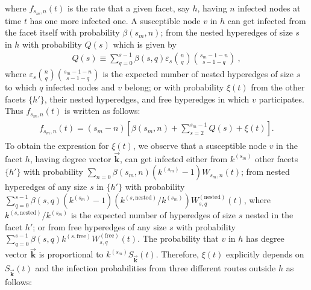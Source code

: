 \documentclass[aps,pre,twocolumn,nofootinbib,superscriptaddress,showpacs,showkeys]{revtex4-1}
\begin{document}
where $f_{s_{m},n}(t)$ is the rate that a given facet, say $h$, having $n$ infected nodes at time $t$ has one more infected one. 
A susceptible node $v$ in $h$ can get infected from the facet itself with probability $\beta(s_m,n)$; from the nested hyperedges of size $s$ in $h$ with probability $Q(s)$ which is given by
\begin{align}
Q(s)\equiv\sum_{q=0}^{s-1}\beta(s,q)\varepsilon_s {n \choose q}{s_m-1-n \choose s-1-q}~,
\end{align}
where $\varepsilon_s{n \choose q}{s_m-1-n \choose s-1-q}$ is the expected number of nested hyperedges of size $s$ to which $q$ infected nodes and $v$ belong; 
 or with probability $\xi(t)$ from the other facets $\{h'\}$, their nested hyperedges, and free hyperedges in which $v$ participates. 
Thus $f_{s_m,n}(t)$ is written as follows:  
\begin{align}
\begin{array}{ll}
    f_{s_{m},n}(t)=(s_{m}-n)\left[\beta(s_{m},n)
    +\sum\limits_{s=2}^{s_{m}-1} Q(s)+\xi(t)\right].
    \label{eq:eq4}
\end{array}
\end{align} 
To obtain the expression for $\xi(t)$, we observe that
a susceptible node $v$ in the facet $h$, having degree vector $\vec{\mathbf{k}}$, can get infected either from $k^{(s_m)}$ other facets $\{h'\}$ with probability $\sum_{n=0} \beta(s_m,n)(k^{(s_m)}-1)W_{s_m,n}(t)$; from nested hyperedges of any size $s$ in $\{h'\}$ with probability $\sum_{q=0}^{s-1} \beta(s,q)(k^{(s_{m})}-1)(k^{(s,\mathrm{nested})}/k^{(s_m)})W^{(\mathrm{nested})}_{s,q}(t)$, where $k^{(s,\mathrm{nested})}/k^{(s_m)}$ is the expected number of hyperedges of size $s$ nested in the facet $h'$; or from free hyperedges of any size $s$ with probability $\sum_{q=0}^{s-1} \beta(s,q) k^{(s,\mathrm{free})}W^{(\mathrm{free})}_{s,q}(t)$. The probability that $v$ in $h$ has degree vector $\vec{\mathbf{k}}$ is proportional to $k^{(s_m)}S_{\vec{\mathbf{k}}}(t)$. 
Therefore, $\xi(t)$ explicitly depends on $S_{\vec{\mathbf{k}}}(t)$ and the infection probabilities from three different routes outside $h$ as follows:
\end{document}
